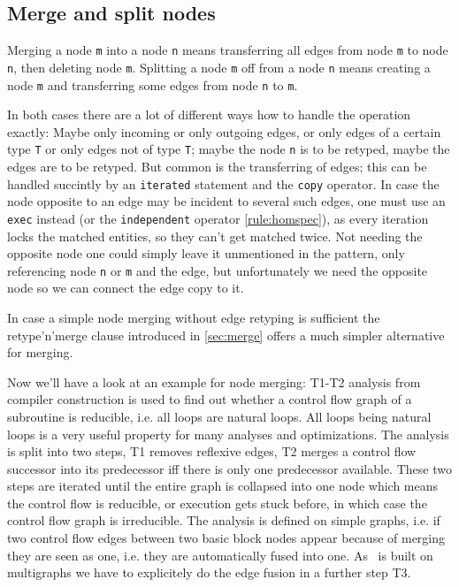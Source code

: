 \subsection{Merge and split nodes}
Merging a node \texttt{m} into a node \texttt{n} means transferring all edges from node \texttt{m} to node \texttt{n}, then deleting node \texttt{m}.
Splitting a node \texttt{m} off from a node \texttt{n} means creating a node \texttt{m} and transferring some edges from node \texttt{n} to \texttt{m}.

In both cases there are a lot of different ways how to handle the operation exactly:
Maybe only incoming or only outgoing edges, or only edges of a certain type \texttt{T} or only edges not of type \texttt{T}; maybe the node \texttt{n} is to be retyped, maybe the edges are to be retyped.
But common is the transferring of edges; this can be handled succintly by an \texttt{iterated} statement and the \texttt{copy} operator.
In case the node opposite to an edge may be incident to several such edges, one must use an \texttt{exec} instead (or the \texttt{independent} operator \ref{rule:homspec}), as every iteration locks the matched entities, so they can't get matched twice. Not needing the opposite node one could simply leave it unmentioned in the pattern, only referencing node \texttt{n} or \texttt{m} and the edge, but unfortunately we need the opposite node so we can connect the edge copy to it.

\begin{note}
In case a simple node merging without edge retyping is sufficient the retype'n'merge clause introduced in \ref{sec:merge} offers a much simpler alternative for merging.
\end{note}

Now we'll have a look at an example for node merging: T1-T2 analysis from compiler construction is used to find out whether a control flow graph of a subroutine is reducible, i.e. all loops are natural loops. All loops being natural loops is a very useful property for many analyses and optimizations. The analysis is split into two steps, T1 removes reflexive edges, T2 merges a control flow successor into its predecessor iff there is only one predecessor available. These two steps are iterated until the entire graph is collapsed into one node which means the control flow is reducible, or execution gets stuck before, in which case the control flow graph is irreducible.
The analysis is defined on simple graphs, i.e. if two control flow edges between two basic block nodes appear because of merging they are seen as one, i.e. they are automatically fused into one. As \GrG~is built on multigraphs we have to explicitely do the edge fusion in a further step T3.

